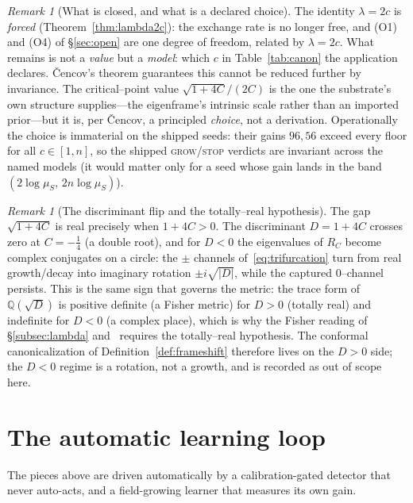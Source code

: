\documentclass[11pt]{article}
\theoremstyle{plain}
\theoremstyle{definition}
\theoremstyle{remark}
\newtheorem{remark}[theorem]{Remark}
\newcommand{\Q}{\mathbb{Q}}
\begin{document}
\begin{remark}[What is closed, and what is a declared choice]\label{rem:lambdaclose}
The identity $\lambda=2c$ is \emph{forced} (Theorem~\ref{thm:lambda2c}): the exchange rate is no longer free, and
(O1) and (O4) of \S\ref{sec:open} are one degree of freedom, related by $\lambda=2c$. What remains is not a
\emph{value} but a \emph{model}: which $c$ in Table~\ref{tab:canon} the application declares. \v{C}encov's theorem
guarantees this cannot be reduced further by invariance. The critical--point value $\sqrt{1+4C}/(2C)$ is the one
the substrate's own structure supplies---the eigenframe's intrinsic scale rather than an imported prior---but it
is, per \v{C}encov, a principled \emph{choice}, not a derivation. Operationally the choice is immaterial on the
shipped seeds: their gains $96,56$ exceed every floor for all $c\in[1,n]$, so the shipped \textsc{grow}/\textsc{stop}
verdicts are invariant across the named models (it would matter only for a seed whose gain lands in the band
$(2\log\mu_S,\,2n\log\mu_S)$).
\end{remark}

\begin{remark}[The discriminant flip and the totally--real hypothesis]\label{rem:flip}
The gap $\sqrt{1+4C}$ is real precisely when $1+4C>0$. The discriminant $D=1+4C$ crosses zero at $C=-\tfrac14$
(a double root), and for $D<0$ the eigenvalues of $R_C$ become complex conjugates on a circle: the $\pm$ channels
of~\eqref{eq:trifurcation} turn from real growth/decay into imaginary rotation $\pm i\sqrt{|D|}$, while the
captured $0$--channel persists. This is the same sign that governs the metric: the trace form of $\Q(\sqrt D)$ is
positive definite (a Fisher metric) for $D>0$ (totally real) and indefinite for $D<0$ (a complex place), which is
why the Fisher reading of \S\ref{subsec:lambda} and~\cite{VectorSubstrate} requires the totally--real hypothesis.
The conformal canonicalization of Definition~\ref{def:frameshift} therefore lives on the $D>0$ side; the
$D<0$ regime is a rotation, not a growth, and is recorded as out of scope here.
\end{remark}

\section{The automatic learning loop}\label{sec:loop}

The pieces above are driven automatically by a calibration-gated detector that never auto-acts, and a
field-growing learner that measures its own gain.
\end{document}
